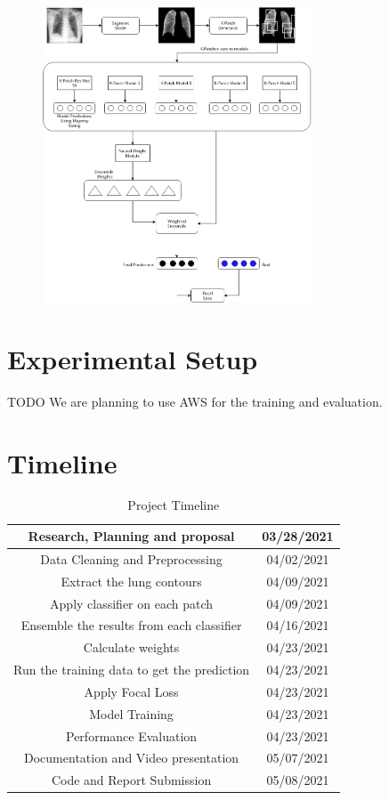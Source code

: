 \documentclass{sigkddExp}
\begin{document}
\begin{figure}[h]
    \includegraphics[width=8cm]{../doc/images/FLANNEL-IMPROVED.png}
\end{figure}


\section{Experimental Setup}
TODO
We are planning to use AWS for the training and evaluation.

\section{Timeline}


\begin{table}[H]
    \centering
    \caption{Project Timeline}
    \begin{tabular}{|c|c|} \hline
        Research, Planning and proposal &03/28/2021\\ \hline
        Data Cleaning and Preprocessing & 04/02/2021\\ \hline
        Extract the lung contours & 04/09/2021\\ \hline
        Apply classifier on each patch & 04/09/2021\\ \hline
        Ensemble the results from each classifier & 04/16/2021\\ \hline
        Calculate weights & 04/23/2021 \\ \hline
        Run the training data to get the prediction & 04/23/2021 \\ \hline
        Apply Focal Loss & 04/23/2021 \\ \hline
        Model Training & 04/23/2021 \\ \hline
        Performance Evaluation & 04/23/2021 \\ \hline
        Documentation and Video presentation & 05/07/2021 \\
        Code and Report Submission & 05/08/2021 \\
        \hline\end{tabular}
    \end{table}
    
    
    
    
\end{document}
